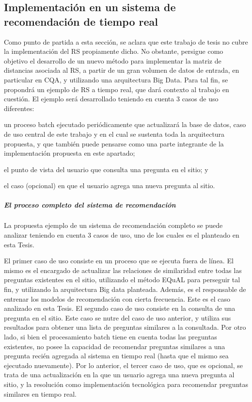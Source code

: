 \subsection{Implementación en un sistema de recomendación de tiempo real}

Como punto de partida a esta sección, se aclara que este trabajo de tesis no cubre la implementación del RS propiamente dicho. No obstante, persigue como objetivo el desarrollo de un nuevo método para implementar la matriz de distancias asociada al RS, a partir de un gran volumen de datos de entrada, en particular en CQA, y utilizando una arquitectura Big Data. Para tal fin, se propondrá un ejemplo de RS a tiempo real, que dará contexto al trabajo en cuestión. El ejemplo será desarrollado teniendo en cuenta 3 casos de uso diferentes: \begin{enumerate*} [label=(\roman*)] \item un proceso batch ejecutado periódicamente que actualizará la base de datos, caso de uso central de este trabajo y en el cual se sustenta toda la arquitectura propuesta, y que también puede pensarse como una parte integrante de la implementación propuesta en este apartado; \item el punto de vista del usuario que consulta una pregunta en el sitio; y \item el caso  (opcional) en que el usuario agrega una nueva pregunta al sitio.\end{enumerate*}

\subparagraph{El proceso completo del sistema de recomendación}
La propuesta ejemplo de un sistema de recomendación completo se puede analizar teniendo en cuenta 3 casos de uso, uno de los cuales es el planteado en esta Tesis.

\bigskip El primer caso de uso consiste en un proceso que se ejecuta fuera de línea. El mismo es el encargado de actualizar las relaciones de similaridad entre todas las preguntas existentes en el sitio, utilizando el método EQuAL para perseguir tal fin, y utilizando la arquitectura Big data planteada. Además, es el responsable de entrenar los modelos de recomendación con cierta frecuencia. Este es el caso analizado en esta Tesis. El segundo caso de uso consiste en la consulta de una pregunta en el sitio. Este caso se nutre del caso de uso anterior, y utiliza sus resultados para obtener una lista de preguntas similares a la consultada. Por otro lado, si bien el procesamiento batch tiene en cuenta todas las preguntas existentes, no posee la capacidad de recomendar preguntas similares a una pregunta recién agregada al sistema en tiempo real (hasta que el mismo sea ejecutado nuevamente). Por lo anterior, el tercer caso de uso, que es opcional, se trata de una actualización en la que un usuario agrega una nueva pregunta al sitio, y la resolución como implementación tecnológica para recomendar preguntas similares en tiempo real.


